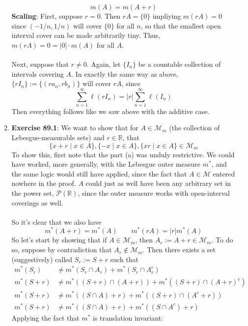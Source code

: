 \documentclass[12pt]{article}
\theoremstyle{plain}
\theoremstyle{definition}
\theoremstyle{remark}
\begin{document}
\begin{enumerate}
\begin{enumerate}
\[
    m(A) = m(A+r)
\]
\textbf{Scaling}: First, suppose $r=0$. Then $rA=\{0\}$ impliying $m(rA)=0$ since $(-1/n, 1/n)$ will cover $\{0\}$ for all $n$, so that the smallest open interval cover can be made arbitrarily tiny. Thus, $m(rA)=0=|0|\cdot m(A)$ for all $A$.
\\
\\
Next, suppose that $r\neq 0$. Again, let $\{I_n\}$ be a countable collection of intervals covering $A$. In exactly the same way as above, $\{r I_n\} := \{(r a_n,r  b_n)\}$ will cover $rA$, since
\[
    \sum_{n=1}^\infty \ell(rI_n) = |r| \sum_{n=1}^\infty\ell(I_n)
\]
Then everything follows like we saw above with the additive case.

\item     

\textbf{Exercise 89.1}: We want to show that for $A\in\mathscr{M}_m$ (the collection of Lebesgue-measurable sets) and $r\in\mathbb{R}$, that 
\begin{equation}
    \label{q1.given}
    \{x+r\;|\;x\in A\}, 
    \{-x\;|\;x\in A\}, 
    \{xr\;|\;x\in A\}\in \mathscr{M}_m
\end{equation}
To show this, first note that the part (a) was unduly restrictive.  We could have worked, more generally, with the Lebesgue outer measure $m^*$, and the same logic would still have applied, since the fact that $A\in\mathscr{M}$ entered nowhere in the proof. $A$ could just as well have been any arbitrary set in the power set, $\mathscr{P}(\mathbb{R})$, since the outer measure works with open-interval coverings as well.
\\
\\
So it's clear that we also have
\[
    m^*(A + r) = m^*(A) \qquad m^*(rA) = |r|m^*(A)
\]
So let's start by showing that if $A\in \mathscr{M}_m$, then $A_r:=A+r \in \mathscr{M}_m$. To do so, suppose by contradiction that $A_r \not\in \mathscr{M}_m$. Then there exists a set (suggestively) called $S_r := S + r$ such that 
\begin{align*}
    \label{q1.contra}
    m^*(S_r) &\neq m^*(S_r \cap A_r) +m^*(S_r \cap A_r^c) \\
    m^*(S+r) &\neq m^*((S + r) \cap (A+r)) +m^*((S+r) \cap (A+r)^c) \\
    m^*(S+r) &\neq m^*((S\cap A)+ r) +m^*((S+r) \cap (A^c+r)) \\
    m^*(S+r) &\neq m^*((S\cap A)+ r) +m^*((S\cap A^c)+r) 
\end{align*}
Applying the fact that $m^*$ is translation invariant:
\begin{align*}

\end{align*}
\end{enumerate}
\end{enumerate}
\end{document}
